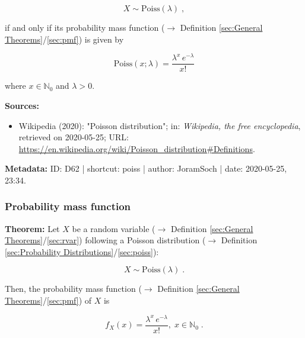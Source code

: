 \documentclass[a4paper,12pt,twoside]{book}
\begin{document}
\begin{equation} \label{eq:poiss-poiss}
X \sim \mathrm{Poiss}(\lambda) \; ,
\end{equation}

if and only if its probability mass function ($\rightarrow$ Definition \ref{sec:General Theorems}/\ref{sec:pmf}) is given by

\begin{equation} \label{eq:poiss-poiss-pmf}
\mathrm{Poiss}(x; \lambda) = \frac{\lambda^x \, e^{-\lambda}}{x!}
\end{equation}

where $x \in \mathbb{N}_0$ and $\lambda > 0$.


\vspace{1em}
\textbf{Sources:}
\begin{itemize}
\item Wikipedia (2020): "Poisson distribution"; in: \textit{Wikipedia, the free encyclopedia}, retrieved on 2020-05-25; URL: \url{https://en.wikipedia.org/wiki/Poisson_distribution#Definitions}.
\end{itemize}


\vspace{1em}
\textbf{Metadata:} ID: D62 | shortcut: poiss | author: JoramSoch | date: 2020-05-25, 23:34.
\vspace{1em}



\subsubsection[\textbf{Probability mass function}]{Probability mass function} \label{sec:poiss-pmf}
\setcounter{equation}{0}

\textbf{Theorem:} Let $X$ be a random variable ($\rightarrow$ Definition \ref{sec:General Theorems}/\ref{sec:rvar}) following a Poisson distribution ($\rightarrow$ Definition \ref{sec:Probability Distributions}/\ref{sec:poiss}):

\begin{equation} \label{eq:poiss-pmf-Poiss}
X \sim \mathrm{Poiss}(\lambda) \; .
\end{equation}

Then, the probability mass function ($\rightarrow$ Definition \ref{sec:General Theorems}/\ref{sec:pmf}) of $X$ is

\begin{equation} \label{eq:poiss-pmf-Poiss-pmf}
f_X(x) = \frac{\lambda^x \, e^{-\lambda}}{x!}, \; x \in \mathbb{N}_0 \; .
\end{equation}
\end{document}
